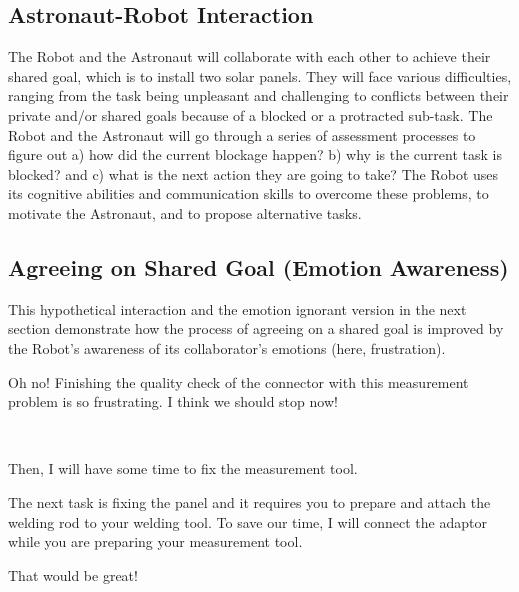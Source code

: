 \subsection{Astronaut-Robot Interaction}

The Robot and the Astronaut will collaborate with each other to achieve their
shared goal, which is to install two solar panels. They will face various
difficulties, ranging from the task being unpleasant and challenging to
conflicts between their private and/or shared goals because of a blocked or a
protracted sub-task. The Robot and the Astronaut will go through a series of
assessment processes to figure out a) how did the current blockage happen? b)
why is the current task is blocked? and c) what is the next action they are
going to take? The Robot uses its cognitive abilities and communication skills
to overcome these problems, to motivate the Astronaut, and to propose
alternative tasks.

\subsection{Agreeing on Shared Goal (Emotion Awareness)}
\label{sec:exp1}

This hypothetical interaction and the emotion ignorant version in the next
section demonstrate how the process of agreeing on a shared goal is improved by
the Robot's awareness of its collaborator's emotions (here, frustration).

\begin{description}
  \item \textit{\textbf{\fontsize{9pt}{12pt}\selectfont{A1. Astronaut:}}} Oh
  no! Finishing the quality check of the connector with this measurement
  problem is so frustrating. I think we should stop now!\\

  \item {}\\
  
  \item \textit{\textbf{\fontsize{9pt}{12pt}\selectfont{A3. Astronaut:}}} Then,
  I will have some time to fix the measurement tool.\\

  \item \textit{\textbf{\fontsize{9pt}{12pt}\selectfont{A4. Robot:}}} The next
  task is fixing the panel and it requires you to prepare and attach the welding
  rod to your welding tool. To save our time, I will connect the adaptor while
  you are preparing your measurement tool.\\

  \item \textit{\textbf{\fontsize{9pt}{12pt}\selectfont{A5. Astronaut:}}} That
  would be great!
  
\end{description}

